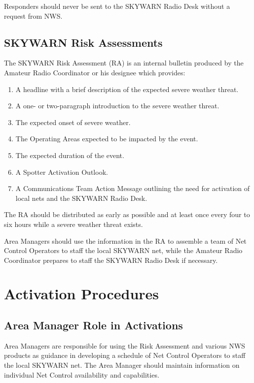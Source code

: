 \documentclass[pdflatex,letterpaper,twoside,12pt]{book}
\begin{document}
Responders should never be sent to the SKYWARN Radio Desk without a request from NWS.

\subsection{SKYWARN Risk Assessments}\label{risk-assessments}

The SKYWARN Risk Assessment (RA) is an internal bulletin produced by the Amateur Radio Coordinator or his designee which provides:

\begin{enumerate}
\item A headline with a brief description of the expected severe weather threat.
\item A one- or two-paragraph introduction to the severe weather threat.
\item The expected onset of severe weather.
\item The Operating Areas expected to be impacted by the event.
\item The expected duration of the event.
\item A Spotter Activation Outlook.
\item A Communications Team Action Message outlining the need for activation of local nets and the SKYWARN Radio Desk.
\end{enumerate}

The RA should be distributed as early as possible and at least once every four to six hours while a severe weather threat exists.

Area Managers should use the information in the RA to assemble a team of Net Control Operators to staff the local SKYWARN net, while the Amateur Radio Coordinator prepares to staff the SKYWARN Radio Desk if necessary.


\section{Activation Procedures}

\subsection{Area Manager Role in Activations}

Area Managers are responsible for using the Risk Assessment and various NWS products as guidance in developing a schedule of Net Control Operators to staff the local SKYWARN net.  The Area Manager should maintain information on individual Net Control availability and capabilities.
\end{document}
